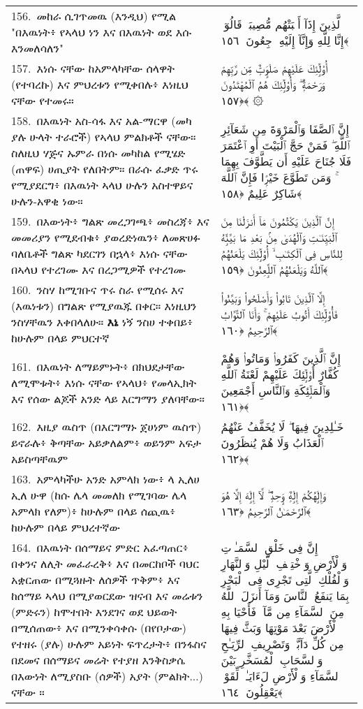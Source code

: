 \documentclass[11pt,a4paper,oneside]{article}%
\newcommand{\mytextarabic}[1]{\textarabic{ #1 \flushright}}
\begin{document}
\begin{longtable}{%
  @{}
    p{}
  @{~~~}
    p{}
    @{}
}
156.\ መከራ ሲገጥመዉ (እንዲህ) የሚል "በእዉነት፥ የኣላህ ነን እና በእዉነት ወደ እሱ እንመለሳለን" &  \mytextarabic{ٱلَّذِينَ إِذَآ أَصَٟبَتْهُم مُّصِيبَةٌۭ قَالُوٓا۟ إِنَّا لِلَّهِ وَإِنَّآ إِلَيْهِ رَٟجِعُونَ ﴿١٥٦﴾}\\
157.\ እነሱ ናቸው ከአምላካቸው ሰላዋት (የተባረኩ) እና ምህረቱን የሚቀበሉ፥ እነዚህ ናቸው የተመሩ። &  \mytextarabic{ أُو۟لَٟٓئِكَ عَلَيْهِمْ صَلَوَٟتٌۭ مِّن رَّبِّهِمْ وَرَحْمَةٌۭ ۖ وَأُو۟لَٟٓئِكَ هُمُ ٱلْمُهْتَدُونَ ﴿١٥٧﴾ ۞}\\
158.\ በእዉነት አስ-ሳፋ እና አል-ማርዋ (መካ ያሉ ሁላት ተራሮች) የኣላህ ምልክቶች ናቸው። ስለዚህ ሃጅና ኡምራ በነሱ መካከል የሚሄድ (ጠዋፍ) ሀጢያት የለበትም። በራሱ ፈቃድ ጥሩ የሚያደርግ፥ በእዉነት ኣላህ ሁሉን አስተዋይና ሁሉን-አዋቂ ነው።  &  \mytextarabic{إِنَّ ٱلصَّفَا وَٱلْمَرْوَةَ مِن شَعَآئِرِ ٱللَّهِ ۖ فَمَنْ حَجَّ ٱلْبَيْتَ أَوِ ٱعْتَمَرَ فَلَا جُنَاحَ عَلَيْهِ أَن يَطَّوَّفَ بِهِمَا ۚ وَمَن تَطَوَّعَ خَيْرًۭا فَإِنَّ ٱللَّهَ شَاكِرٌ عَلِيمٌ ﴿١٥٨﴾}\\
159.\ በእውነት፥ ግልጽ መረጋገጫ፥ መስረጃ፥ እና መመሪያን የሚደብቁ፥ ያወረድነዉን፥ ለመጽሀፉ ባለቤቶች ግልጽ ካደርገን በኋላ፥ እነሱ ናቸው በኣላህ የተረገሙ እና በረጋሚዎች የተረገሙ  &  \mytextarabic{إِنَّ ٱلَّذِينَ يَكْتُمُونَ مَآ أَنزَلْنَا مِنَ ٱلْبَيِّنَـٰتِ وَٱلْهُدَىٰ مِنۢ بَعْدِ مَا بَيَّنَّٟهُ لِلنَّاسِ فِى ٱلْكِتَـٰبِ ۙ أُو۟لَٟٓئِكَ يَلْعَنُهُمُ ٱللَّهُ وَيَلْعَنُهُمُ ٱللَّٟعِنُونَ ﴿١٥٩﴾}\\
160.\ ንስሃ ከሚገቡና ጥሩ ስራ የሚሰሩ እና (እዉነቱን) በግልጽ የሚያዉጁ በቀር። እነዚህን ንስሃቸዉን እቀበላለሁ።  {\bf እኔ} ነኝ ንስሀ ተቀበይ፥ ከሁሉም በላይ ምህርተኛ &  \mytextarabic{ إِلَّا ٱلَّذِينَ تَابُوا۟ وَأَصْلَحُوا۟ وَبَيَّنُوا۟ فَأُو۟لَٟٓئِكَ أَتُوبُ عَلَيْهِمْ ۚ وَأَنَا ٱلتَّوَّابُ ٱلرَّحِيمُ ﴿١٦٠﴾}\\
161.\ በእዉነት ለማይምኑት፥ በክህደታቸው ለሚሞቱት፥ እነሱ ናቸው የኣላህ፥ የመላኢክት እና የሰው ልጆች አንድ ላይ እርግማን ያለባቸው። &  \mytextarabic{ إِنَّ ٱلَّذِينَ كَفَرُوا۟ وَمَاتُوا۟ وَهُمْ كُفَّارٌ أُو۟لَٟٓئِكَ عَلَيْهِمْ لَعْنَةُ ٱللَّهِ وَٱلْمَلَٟٓئِكَةِ وَٱلنَّاسِ أَجْمَعِينَ ﴿١٦١﴾}\\
162.\ እዚያ ዉስጥ (በእርግማኑ ጀሀነም ዉስጥ) ይኖራሉ፥ ቅጣቸው አይቃለልም፥ ወይንም አፍታ አይስጣቸዉም &  \mytextarabic{خَـٰلِدِينَ فِيهَا ۖ لَا يُخَفَّفُ عَنْهُمُ ٱلْعَذَابُ وَلَا هُمْ يُنظَرُونَ ﴿١٦٢﴾}\\
163.\ አምላካችሁ አንድ አምላክ ነው፥ ላ ኢለሀ ኢለ ሁዋ (ከሱ ሌላ መመለክ የሚገባው ሌላ አምላክ የለም)፥ ከሁሉም በላይ ሰጪዉ፥ ከሁሉም በላይ ምህረተኛው &  \mytextarabic{وَإِلَٟهُكُمْ إِلَٟهٌۭ وَٟحِدٌۭ ۖ لَّآ إِلَٟهَ إِلَّا هُوَ ٱلرَّحْمَـٰنُ ٱلرَّحِيمُ ﴿١٦٣﴾}\\
164.\ በእዉነት በሰማይና ምድር አፈጣጠር፥ በቀንና ለሊት መፈራረቅ፥ እና በመርከቦች ባህር አቋርጠው በሚጓዙት ለሰዎች ጥቅም፥ እና ከሰማይ ኣላህ በሚያወርደው ዝናብ እና መሬቱን (ምድሩን) ከሞተበት እንደገና ወደ ህይወት በሚሰጠው፥ እና በሚንቀሳቀሱ (በየቦታው) የተዘሩ (ያሉ) ሁሉም አይነት ፍጥረታት፥ በንፋስና በደመና በሰማይና መሬት የተያዘ እንቅስቃሴ በእውነት ለሚያስቡ (ሰዎች) አያት (ምልክት...) ናቸው ። &  \mytextarabic{إِنَّ فِى خَلْقِ ٱلسَّمَـٰوَٟتِ وَٱلْأَرْضِ وَٱخْتِلَٟفِ ٱلَّيْلِ وَٱلنَّهَارِ وَٱلْفُلْكِ ٱلَّتِى تَجْرِى فِى ٱلْبَحْرِ بِمَا يَنفَعُ ٱلنَّاسَ وَمَآ أَنزَلَ ٱللَّهُ مِنَ ٱلسَّمَآءِ مِن مَّآءٍۢ فَأَحْيَا بِهِ ٱلْأَرْضَ بَعْدَ مَوْتِهَا وَبَثَّ فِيهَا مِن كُلِّ دَآبَّةٍۢ وَتَصْرِيفِ ٱلرِّيَـٰحِ وَٱلسَّحَابِ ٱلْمُسَخَّرِ بَيْنَ ٱلسَّمَآءِ وَٱلْأَرْضِ لَءَايَـٰتٍۢ لِّقَوْمٍۢ يَعْقِلُونَ ﴿١٦٤﴾}\\

\end{longtable}
\end{document}
